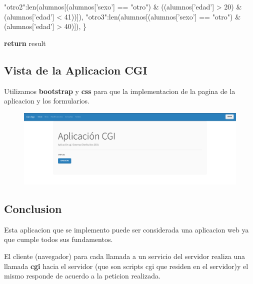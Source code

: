 \documentclass[12pt]{extarticle}
\makeatletter
\def\maxwidth{\ifdim\Gin@nat@width>\linewidth\linewidth
    \else\Gin@nat@width\fi}
\let\Oldincludegraphics\includegraphics
\renewcommand{\includegraphics}[1]{\Oldincludegraphics[width=.8\maxwidth]{#1}}
\newenvironment{Shaded}{}{}
\newcommand{\DecValTok}[1]{\textcolor[rgb]{0.25,0.63,0.44}{{#1}}}
\newcommand{\StringTok}[1]{\textcolor[rgb]{0.25,0.44,0.63}{{#1}}}
\newcommand{\NormalTok}[1]{{#1}}
\newcommand{\ControlFlowTok}[1]{\textcolor[rgb]{0.00,0.44,0.13}{\textbf{{#1}}}}
\newcommand{\OperatorTok}[1]{\textcolor[rgb]{0.40,0.40,0.40}{{#1}}}
\newcommand{\BuiltInTok}[1]{{#1}}
\makeatother
\begin{document}
\begin{Shaded}
\begin{Highlighting}[]
            \StringTok{"otro2"}\NormalTok{:}\BuiltInTok{len}\NormalTok{(alumnos[(alumnos[}\StringTok{'sexo'}\NormalTok{] }\OperatorTok{==} \StringTok{"otro"}\NormalTok{) }\OperatorTok{&}\NormalTok{ ((alumnos[}\StringTok{'edad'}\NormalTok{] }\OperatorTok{>} \DecValTok{20}\NormalTok{) }\OperatorTok{&}\NormalTok{ (alumnos[}\StringTok{'edad'}\NormalTok{] }\OperatorTok{<} \DecValTok{41}\NormalTok{))]),}
            \StringTok{"otro3"}\NormalTok{:}\BuiltInTok{len}\NormalTok{(alumnos[(alumnos[}\StringTok{'sexo'}\NormalTok{] }\OperatorTok{==} \StringTok{"otro"}\NormalTok{) }\OperatorTok{&}\NormalTok{ (alumnos[}\StringTok{'edad'}\NormalTok{] }\OperatorTok{>} \DecValTok{40}\NormalTok{)]),}
\NormalTok{        \}}

        \ControlFlowTok{return}\NormalTok{ result}
\end{Highlighting}
\end{Shaded}

\subsection{Vista de la Aplicacion
CGI}\label{vista-de-la-aplicacion-cgi}

Utilizamos \textbf{bootstrap} y \textbf{css} para que la implementacion
de la pagina de la aplicacion y los formularios.

\begin{figure}[h]
\centering
\includegraphics{images/interfaz-cgi.png}
\caption{}
\end{figure}

\subsection{Conclusion}\label{conclusion}

Esta aplicacion que se implemento puede ser considerada una aplicacion
web ya que cumple todos sus fundamentos.

El cliente (navegador) para cada llamada a un servicio del servidor
realiza una llamada \textbf{cgi} hacia el servidor (que son scripts cgi
que residen en el servidor)y el mismo responde de acuerdo a la peticion
realizada.
\end{document}

